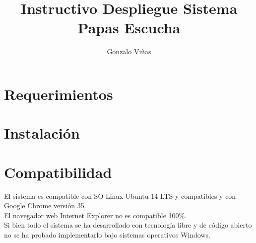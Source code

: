 \documentclass[11pt]{article}
\title{\textbf{Instructivo Despliegue Sistema Papas Escucha}}
\author{Gonzalo Viñas}
\date{}
\begin{document}
\maketitle

\section{Requerimientos}

\section{Instalación}


\section{Compatibilidad}
El sistema es compatible con SO Linux Ubuntu 14 LTS y compatibles y con Google Chrome versión 35.
\\
El navegador web Internet Explorer no es compatible 100\%.
\\
Si bien todo el sistema se ha desarrollado con tecnología libre y de código abierto no se ha probado implementarlo bajo sistemas operativos Windows.
\end{document}
